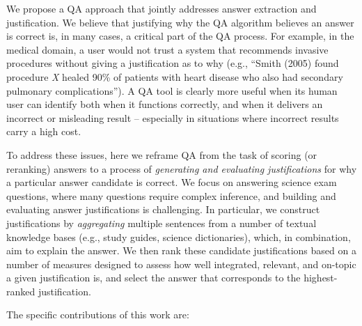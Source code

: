 


We propose a QA approach that jointly addresses answer extraction and justification.
We believe that justifying why the QA algorithm believes an answer is correct is, in many cases, a critical part of the QA process.
For example, in the medical domain, a user would not trust a system that recommends invasive procedures without giving a justification as to why (e.g., ``Smith (2005) found procedure \emph{X} healed 90\% of patients with heart disease who also had secondary pulmonary complications'').  A QA tool is clearly more useful when its human user can identify both when it functions correctly, and when it delivers an incorrect or misleading result -- especially in situations where incorrect results carry a high cost.  



To address these issues, here we reframe QA from the task of scoring (or reranking) answers to 
a process of \emph{generating and evaluating justifications} for why a particular answer candidate is correct. 
We focus on answering science exam questions, where many questions require complex inference, and building and evaluating answer justifications is challenging. 
In particular, we construct justifications by {\em aggregating} multiple sentences from a number of textual knowledge bases (e.g., study guides, science dictionaries), which, in combination, aim to explain the answer.
We then rank these candidate justifications based on a number of measures designed to assess how well integrated, relevant, and on-topic a given justification is, and select the answer that corresponds to the highest-ranked justification.



The specific contributions of this work are: 

